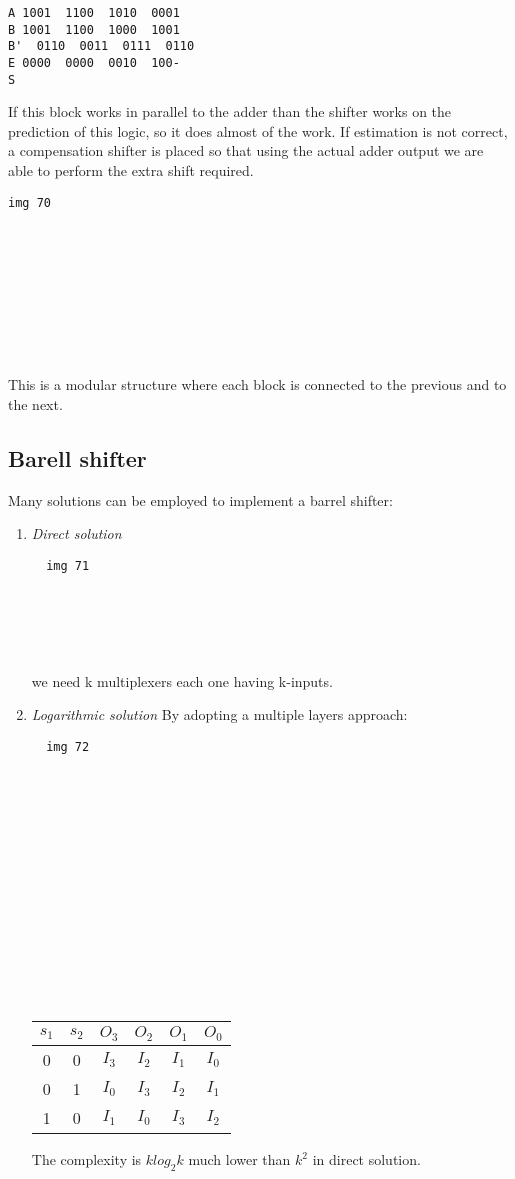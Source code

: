 \begin{verbatim}
A 1001  1100  1010  0001
B 1001  1100  1000  1001
B'  0110  0011  0111  0110
E 0000  0000  0010  100-
S
\end{verbatim}

If this block works in parallel to the adder than the shifter works on the
prediction of this logic, so it does almost of the work. If estimation is not
correct, a compensation shifter is placed so that using the actual adder output
we are able to perform the extra shift required.

\begin{verbatim}
img 70










\end{verbatim}

This is a modular structure where each block is connected to the previous and
to the next.

\subsection{Barell shifter}
Many solutions can be employed to implement a barrel shifter:

\begin{enumerate}
  \item \textit{Direct solution}
  \begin{verbatim}
  img 71






  \end{verbatim}

  we need k multiplexers each one having k-inputs.

  \item \textit{Logarithmic solution}
  By adopting a multiple layers approach:

  \begin{verbatim}
  img 72
















  \end{verbatim}

  \begin{center}
    \begin{tabular}{|c|c|c|c|c|c|}
    \hline
    $s_1$&  $s_2$& $O_3$& $O_2$& $O_1$& $O_0$ \\
    \hline
    0&  0&    $I_3$&  $I_2$&  $I_1$&  $I_0$\\
    0&  1&    $I_0$&  $I_3$&  $I_2$&  $I_1$\\
    1&  0&    $I_1$&  $I_0$&  $I_3$&  $I_2$\\
    \hline
    \end{tabular}
  \end{center}
  The complexity is $k log_2 k$ much lower than $k^2$ in direct solution.
\end{enumerate}
